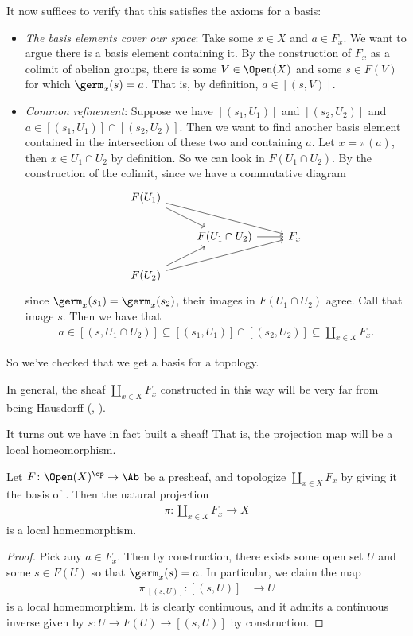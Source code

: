 \documentclass[11pt]{amsart}
\begin{document}
It now suffices to verify that this satisfies the axioms for a basis:
\begin{itemize}
    \item[\textbf{B1}] \emph{The basis elements cover our space}: Take some $x\in X$ and $a\in F_x$. We want to argue there is a basis element containing it. By the construction of $F_x$ as a colimit of abelian groups, there is some $V \in \Open(X)$ and some $s\in F(V)$ for which $\germ_x(s) = a$. That is, by definition, $a\in \left[ (s,V) \right]$.
    \item[\textbf{B2}] \emph{Common refinement}: Suppose we have $[(s_1,U_1)]$ and $[(s_2,U_2)]$ and $a\in \left[ (s_1,U_1) \right] \cap \left[ (s_2,U_2) \right]$. Then we want to find another basis element contained in the intersection of these two and containing $a$. Let $x = \pi(a)$, then $x\in U_1 \cap U_2$ by definition. So we can look in $F(U_1\cap U_2)$. By the construction of the colimit, since we have a commutative diagram
\[ \begin{tikzcd}
    F(U_1)\ar[dr]\ar[drr] &  & \\
     & F(U_1\cap U_2)\rar & F_x\\
    F(U_2)\ar[ur]\ar[urr] &  & 
\end{tikzcd} \]
since $\germ_x(s_1) = \germ_x(s_2)$, their images in $F(U_1\cap U_2)$ agree. Call that image $s$. Then we have that
\begin{align*}
    a\in \left[ (s,U_1\cap U_2) \right] \subseteq \left[ (s_1,U_1) \right]\cap \left[ (s_2,U_2) \right] \subseteq \amalg_{x\in X}F_x.
\end{align*}
\end{itemize}
So we've checked that we get a basis for a topology.

\begin{remark} In general, the sheaf $\amalg_{x\in X}F_x$ constructed in this way will be very far from being Hausdorff (\cite[p.~3]{Bredon-sheaf}, \cite{FAC}).
\end{remark}

It turns out we have in fact built a sheaf! That is, the projection map will be a local homeomorphism.

\begin{lemma} Let $F \colon \Open(X)^\op \to \Ab$ be a presheaf, and topologize $\amalg_{x\in X} F_x$ by giving it the basis of . Then the natural projection
\begin{align*}
    \pi \colon \amalg_{x\in X} F_x \to X
\end{align*}
is a local homeomorphism.
\end{lemma}
\begin{proof} Pick any $a\in F_x$. Then by construction, there exists some open set $U$ and some $s\in F(U)$ so that $\germ_x(s) = a$. In particular, we claim the map
\begin{align*}
    \pi_{|[(s,U)]} \colon [(s,U)] &\to U
\end{align*}
is a local homeomorphism. It is clearly continuous, and it admits a continuous inverse given by $s \colon U \to F(U) \to [(s,U)]$ by construction.
\end{proof}
\end{document}
